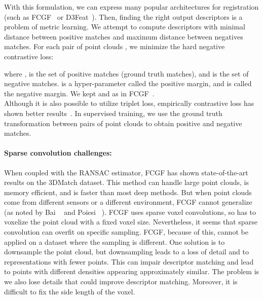 \documentclass[10pt,twocolumn,letterpaper]{article}
\begin{document}
With this formulation, we can express many popular architectures for registration (such as FCGF~\cite{choy2019fully} or D3Feat~\cite{bai2020d3feat}).
Then, finding the right output descriptors is a problem of metric learning. 
We attempt to compute descriptors with minimal distance between positive matches and maximum distance between negatives matches.
For each pair of point clouds , we minimize the hard negative contrastive loss:

where ,  is the set of positive matches (ground truth matches), and  is the set of negative matches.  is a hyper-parameter called the positive margin, and  is called the negative margin. We kept  and  as in FCGF~\cite{choy20194d}.\\

Although it is also possible to utilize triplet loss, empirically contrastive loss
 has shown better results~\cite{choy2019fully}. In supervised training, we use the ground truth transformation between pairs of point clouds to obtain positive and negative matches.

\paragraph{Sparse convolution challenges:}
When coupled with the RANSAC estimator, FCGF has shown state-of-the-art results on the 3DMatch dataset. This method can handle large point clouds, is memory efficient, and is faster than most deep methods. But when point clouds come from different sensors or a different environment, FCGF cannot generalize (as noted by Bai \etal~\cite{bai2020d3feat} and Poiesi \etal~\cite{Poiesi2021}). FCGF uses sparse voxel convolutions, so has to voxelize the point cloud with a fixed voxel size. Nevertheless, it seems that sparse convolution can overfit on specific sampling. FCGF, because of this, cannot be applied on a dataset where the sampling is different.
One solution is to downsample the point cloud, but downsampling leads to a loss of detail and to representations with fewer points. This can impair descriptor matching and lead to points with different densities appearing approximately similar.
The problem is we also lose details that could improve descriptor matching. Moreover, it is difficult to fix the side length of the voxel.
\end{document}
